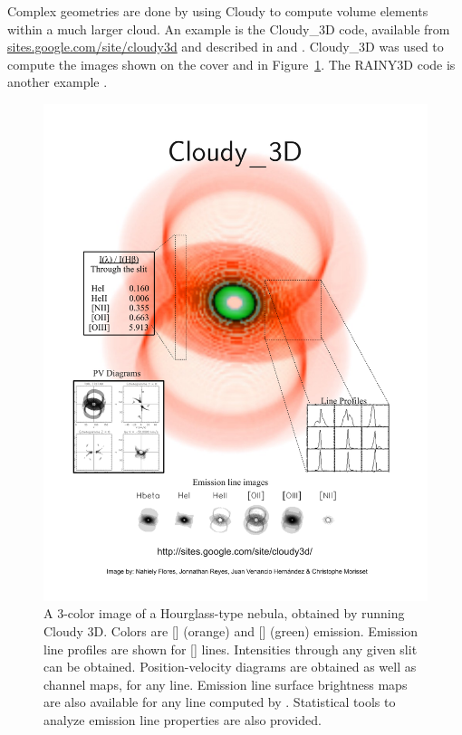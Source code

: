 Complex geometries are done by using Cloudy to compute volume elements
within a much larger cloud.
An example is the Cloudy\_3D code,
available from 
\href{http://sites.google.com/site/cloudy3d/}{sites.google.com/site/cloudy3d}
and described in \citet{MorissetCloudy3D06}
and \citet{MorissetStasinskaCloudy3D08}.
Cloudy\_3D was used to compute
the images shown on the cover and in Figure~\ref{fig:Cloudy3D}.
The RAINY3D code is another example 
\citep{MoraesDiazRAINY09}.

\begin{figure}
\centering
\includegraphics[width=\columnwidth]{posterhazy02}
\caption[Cloudy\_3D simulation of a planetary nebula]
{A 3-color image of a Hourglass-type nebula, 
obtained by running Cloudy 3D.
Colors are [\nii ] (orange) and [\oiii ] (green) emission. 
Emission line profiles are shown for [\nii ] lines. 
Intensities through any given slit can be obtained. 
Position-velocity diagrams are obtained as well as
channel maps, for any line. 
Emission line surface brightness maps are
also available for any line computed by \Cloudy. 
Statistical tools to
analyze emission line properties are also provided.}
\label{fig:Cloudy3D}
\end{figure}

